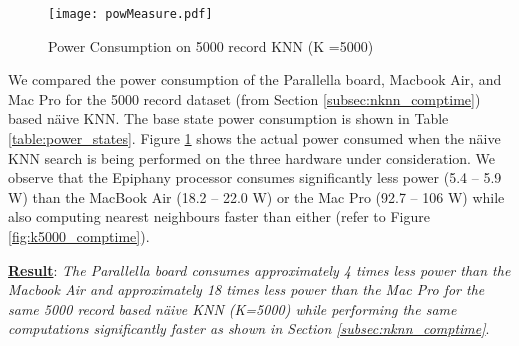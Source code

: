 \begin{figure}[!ht]
\centering
\texttt{[image: powMeasure.pdf]}
\caption{Power Consumption on 5000 record KNN (K =5000)}
\label{fig:pow_cons}
\end{figure}
We compared the power consumption of the Parallella board, Macbook Air, and Mac Pro for the 5000 record dataset (from Section \ref{subsec:nknn_comptime}) based n\"{a}ive KNN. The base state power consumption is shown in Table \ref{table:power_states}. Figure \ref{fig:pow_cons} shows the actual power consumed when the n\"{a}ive KNN search is being performed on the three hardware under consideration. We observe that the Epiphany processor consumes significantly less power (5.4 -- 5.9 W) than the MacBook Air (18.2 -- 22.0 W) or the Mac Pro (92.7 -- 106 W) while also computing nearest neighbours faster than either (refer to Figure \ref{fig:k5000_comptime}). 

\textbf{\underline{Result}}: \textit{The Parallella board consumes approximately 4 times less power than the Macbook Air and approximately 18 times less power than the Mac Pro for the same 5000 record based n\"{a}ive KNN (K=5000) while performing the same computations significantly faster as shown in Section \ref{subsec:nknn_comptime}}.